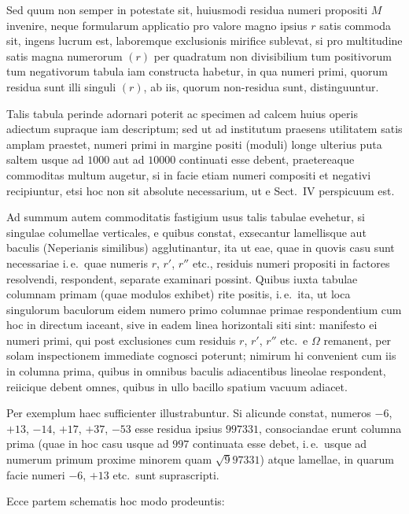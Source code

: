 \documentclass[12pt,a4paper]{article}
\theoremstyle{plain}
\theoremstyle{definition}
\theoremstyle{remark}
\begin{document}
Sed quum non semper in potestate sit, huiusmodi residua numeri propositi $M$ invenire, neque formularum applicatio pro valore magno ipsius $r$ satis commoda sit, ingens lucrum est, laboremque exclusionis mirifice sublevat, si pro multitudine satis magna numerorum $(r)$ per quadratum non divisibilium tum positivorum tum negativorum tabula iam constructa habetur, in qua numeri primi, quorum residua sunt illi singuli $(r)$, ab iis, quorum non-residua sunt, distinguuntur.

Talis tabula perinde adornari poterit ac specimen ad calcem huius operis adiectum supraque iam descriptum; sed ut ad institutum praesens utilitatem satis amplam praestet, numeri primi in margine positi (moduli) longe ulterius puta saltem usque ad $1000$ aut ad $10000$ continuati esse debent, praetereaque commoditas multum augetur, si in facie etiam numeri compositi et negativi recipiuntur, etsi hoc non sit absolute necessarium, ut e Sect.\ IV perspicuum est.

Ad summum autem commoditatis fastigium usus talis tabulae evehetur, si singulae columellae verticales, e quibus constat, exsecantur lamellisque aut baculis (Neperianis similibus) agglutinantur, ita ut eae, quae in quovis casu sunt necessariae i.\,e.\ quae numeris $r$, $r'$, $r''$ etc., residuis numeri propositi in factores resolvendi, respondent, separate examinari possint. Quibus iuxta tabulae columnam primam (quae modulos exhibet) rite positis, i.\,e.\ ita, ut loca singulorum baculorum eidem numero primo columnae primae respondentium cum hoc in directum iaceant, sive in eadem linea horizontali siti sint: manifesto ei numeri primi, qui post exclusiones cum residuis $r$, $r'$, $r''$ etc.\ e $\Omega$ remanent, per solam inspectionem immediate cognosci poterunt; nimirum hi convenient cum iis in columna prima, quibus in omnibus baculis adiacentibus lineolae respondent, reiicique debent omnes, quibus in ullo bacillo spatium vacuum adiacet.

Per exemplum haec sufficienter illustrabuntur. Si alicunde constat, numeros $-6$, $+13$, $-14$, $+17$, $+37$, $-53$ esse residua ipsius $997331$, consociandae erunt columna prima (quae in hoc casu usque ad $997$ continuata esse debet, i.\,e.\ usque ad numerum primum proxime minorem quam $\surd 997331$) atque lamellae, in quarum facie numeri $-6$, $+13$ etc.\ sunt suprascripti.

Ecce partem schematis hoc modo prodeuntis:
\end{document}
